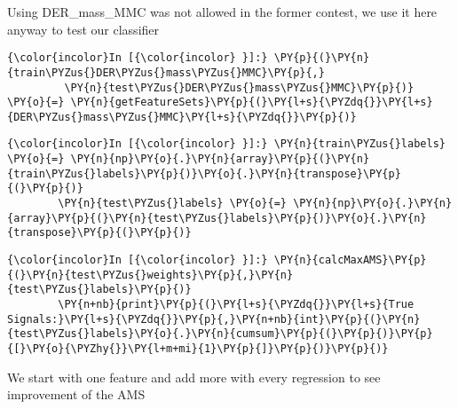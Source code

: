     Using DER\_mass\_MMC was not allowed in the former contest, we use it
here anyway to test our classifier

    \begin{Verbatim}[commandchars=\\\{\}]
{\color{incolor}In [{\color{incolor} }]:} \PY{p}{(}\PY{n}{train\PYZus{}DER\PYZus{}mass\PYZus{}MMC}\PY{p}{,}
         \PY{n}{test\PYZus{}DER\PYZus{}mass\PYZus{}MMC}\PY{p}{)} \PY{o}{=} \PY{n}{getFeatureSets}\PY{p}{(}\PY{l+s}{\PYZdq{}}\PY{l+s}{DER\PYZus{}mass\PYZus{}MMC}\PY{l+s}{\PYZdq{}}\PY{p}{)}
\end{Verbatim}

    \begin{Verbatim}[commandchars=\\\{\}]
{\color{incolor}In [{\color{incolor} }]:} \PY{n}{train\PYZus{}labels} \PY{o}{=} \PY{n}{np}\PY{o}{.}\PY{n}{array}\PY{p}{(}\PY{n}{train\PYZus{}labels}\PY{p}{)}\PY{o}{.}\PY{n}{transpose}\PY{p}{(}\PY{p}{)}
        \PY{n}{test\PYZus{}labels} \PY{o}{=} \PY{n}{np}\PY{o}{.}\PY{n}{array}\PY{p}{(}\PY{n}{test\PYZus{}labels}\PY{p}{)}\PY{o}{.}\PY{n}{transpose}\PY{p}{(}\PY{p}{)}
\end{Verbatim}

    \begin{Verbatim}[commandchars=\\\{\}]
{\color{incolor}In [{\color{incolor} }]:} \PY{n}{calcMaxAMS}\PY{p}{(}\PY{n}{test\PYZus{}weights}\PY{p}{,}\PY{n}{test\PYZus{}labels}\PY{p}{)}
        \PY{n+nb}{print}\PY{p}{(}\PY{l+s}{\PYZdq{}}\PY{l+s}{True Signals:}\PY{l+s}{\PYZdq{}}\PY{p}{,}\PY{n+nb}{int}\PY{p}{(}\PY{n}{test\PYZus{}labels}\PY{o}{.}\PY{n}{cumsum}\PY{p}{(}\PY{p}{)}\PY{p}{[}\PY{o}{\PYZhy{}}\PY{l+m+mi}{1}\PY{p}{]}\PY{p}{)}\PY{p}{)}
\end{Verbatim}

    We start with one feature and add more with every regression to see
improvement of the AMS

